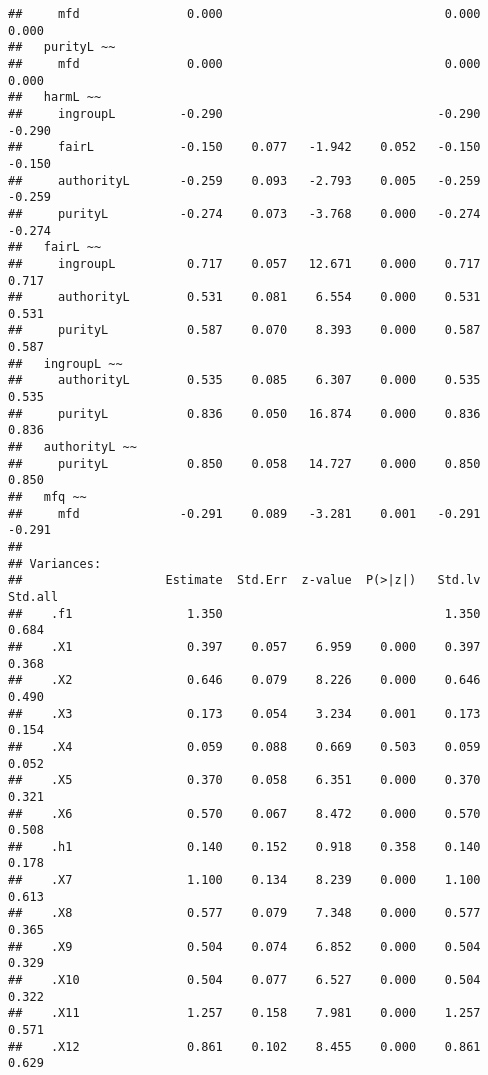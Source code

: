 \documentclass[english,man]{apa6}
\newcounter{author}
\theoremstyle{definition}
\theoremstyle{definition}
\theoremstyle{definition}
\theoremstyle{remark}
\begin{document}
\begin{verbatim}
##     mfd               0.000                               0.000    0.000
##   purityL ~~                                                            
##     mfd               0.000                               0.000    0.000
##   harmL ~~                                                              
##     ingroupL         -0.290                              -0.290   -0.290
##     fairL            -0.150    0.077   -1.942    0.052   -0.150   -0.150
##     authorityL       -0.259    0.093   -2.793    0.005   -0.259   -0.259
##     purityL          -0.274    0.073   -3.768    0.000   -0.274   -0.274
##   fairL ~~                                                              
##     ingroupL          0.717    0.057   12.671    0.000    0.717    0.717
##     authorityL        0.531    0.081    6.554    0.000    0.531    0.531
##     purityL           0.587    0.070    8.393    0.000    0.587    0.587
##   ingroupL ~~                                                           
##     authorityL        0.535    0.085    6.307    0.000    0.535    0.535
##     purityL           0.836    0.050   16.874    0.000    0.836    0.836
##   authorityL ~~                                                         
##     purityL           0.850    0.058   14.727    0.000    0.850    0.850
##   mfq ~~                                                                
##     mfd              -0.291    0.089   -3.281    0.001   -0.291   -0.291
## 
## Variances:
##                    Estimate  Std.Err  z-value  P(>|z|)   Std.lv  Std.all
##    .f1                1.350                               1.350    0.684
##    .X1                0.397    0.057    6.959    0.000    0.397    0.368
##    .X2                0.646    0.079    8.226    0.000    0.646    0.490
##    .X3                0.173    0.054    3.234    0.001    0.173    0.154
##    .X4                0.059    0.088    0.669    0.503    0.059    0.052
##    .X5                0.370    0.058    6.351    0.000    0.370    0.321
##    .X6                0.570    0.067    8.472    0.000    0.570    0.508
##    .h1                0.140    0.152    0.918    0.358    0.140    0.178
##    .X7                1.100    0.134    8.239    0.000    1.100    0.613
##    .X8                0.577    0.079    7.348    0.000    0.577    0.365
##    .X9                0.504    0.074    6.852    0.000    0.504    0.329
##    .X10               0.504    0.077    6.527    0.000    0.504    0.322
##    .X11               1.257    0.158    7.981    0.000    1.257    0.571
##    .X12               0.861    0.102    8.455    0.000    0.861    0.629

\end{verbatim}
\end{document}
